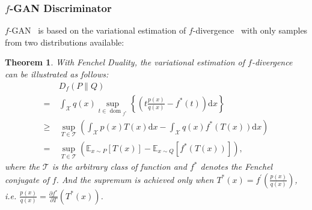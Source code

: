 \documentclass{article}
\newtheorem{theorem}{Theorem}
\begin{document}
\subsubsection{$f$-GAN Discriminator}
\label{f-GAN-d}
$f$-GAN~\cite{nguyen2010estimating} is based on the variational estimation of $f$-divergence~\cite{ali1966general} with only samples from two distributions available:
\begin{theorem}\cite{nguyen2010estimating}
\label{fgan}
With Fenchel Duality, the variational estimation of $f$-divergence can be illustrated as follows:
\begin{align}
&D_{f}(P \| Q) \\
=\ &\int_{\mathcal{X}} q(x) \sup _{t \in \text { dom }_{f^{*}}}\left\{\left(t\frac{p(x)}{q(x)}-f^{*}(t)\right) \mathrm{d} x\right\} \nonumber\\  
\geq\ & \sup _{T \in \mathcal{T}}\left(\int_{\mathcal{X}} p(x) T(x) \mathrm{d} x-\int_{\mathcal{X}} q(x) f^{*}(T(x)) \mathrm{d} x\right) \nonumber\\ =\ &\sup _{T \in \mathcal{T}}\left(\mathbb{E}_{x \sim P}[T(x)]-\mathbb{E}_{x \sim Q}\left[f^{*}(T(x))\right]\right), \nonumber
\end{align}
where the $\mathcal{T}$ is the arbitrary class of function and $f^{*}$ denotes the Fenchel conjugate of $f$. And the supremum is achieved only when $T^{*}(x)=f^{\prime}\left(\frac{p(x)}{q(x)}\right)$, \emph{i.e.} $\frac{p(x)}{q(x)} = \frac{\partial f^{*}}{\partial T}(T^{*}(x))$.
\end{theorem}
\end{document}
